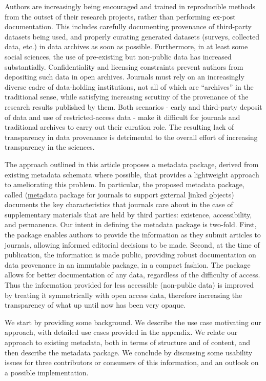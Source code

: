 Authors are increasingly being encouraged and trained in reproducible methods from the outset of their research projects, rather than performing ex-post documentation. This includes carefully documenting provenance of third-party datasets being used, and properly curating generated datasets (surveys, collected data, etc.) in data archives as soon as possible. Furthermore, in at least some social sciences, the use of pre-existing but non-public data has increased substantially.  Confidentiality and licensing constraints prevent authors from depositing such data in open archives. Journals must rely on an increasingly diverse cadre of data-holding institutions, not all of which are ``archives'' in the traditional sense, while satisfying increasing scrutiny of the provenance of the research results published by them. Both scenarios - early and third-party deposit of data and use of restricted-access data - make it difficult for journals and traditional archives to carry out their curation role. The resulting lack of transparency in data provenance is detrimental to the overall effort of increasing transparency in the sciences.

The approach outlined in this article proposes a metadata package, derived from existing metadata schemata where possible, that provides a lightweight approach to ameliorating this problem. In particular, the proposed metadata package, called \metajelo (\underline{meta}data package for \underline{j}ournals to support \underline{e}xternal \underline{l}inked \underline{o}bjects) documents the key characteristics that journals care about in the case of supplementary materials that are held by third parties: existence, accessibility, and permanence. Our intent in defining the metadata package is two-fold. First, the package enables  authors to provide the information as they submit articles to journals, allowing informed editorial decisions to be made. Second, at the time of publication, the information is made public, providing robust documentation on data provenance in an immutable package, in a compact fashion.  The package allows for better documentation of any data, regardless of the difficulty of access.   Thus the information provided for less accessible (non-public data) is improved by treating it symmetrically with open access data, therefore increasing the transparency of what up until now has been very opaque.

We start by providing some background. We describe the use case motivating our approach, with detailed use cases provided in the appendix. We relate our approach to existing metadata, both in terms of structure and of content, and then describe the metadata package. We conclude by discussing some usability issues for three contributors or consumers of this information, and an outlook on a possible implementation.